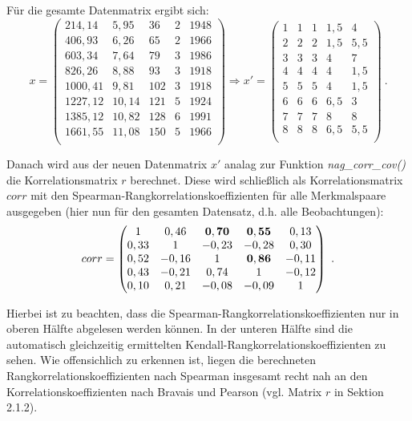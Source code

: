 \noindent Für die gesamte Datenmatrix ergibt sich:
\begin{equation*}
	x =
	\begin{pmatrix}
		214,14 & 5,95 & 36 & 2 & 1948\\
		406,93 & 6,26 & 65 & 2 & 1966\\
		603,34 & 7,64 & 79 & 3 & 1986\\
		826,26 & 8,88 & 93 & 3 & 1918\\
		1000,41 & 9,81 & 102 & 3 & 1918\\
		1227,12 & 10,14 & 121 & 5 & 1924\\
		1385,12 & 10,82 & 128 & 6 & 1991\\
		1661,55 & 11,08 & 150 & 5 & 1966\\
	\end{pmatrix}
	\Rightarrow
	x' =
	\begin{pmatrix}
		1 & 1 & 1 & 1,5 & 4\\
		2 & 2 & 2 & 1,5 & 5,5\\
		3 & 3 & 3 & 4 & 7\\
		4 & 4 & 4 & 4 & 1,5\\
		5 & 5 & 5 & 4 & 1,5\\
		6 & 6 & 6 & 6,5 & 3\\
		7 & 7 & 7 & 8 & 8\\
		8 & 8 & 8 & 6,5 & 5,5\\
	\end{pmatrix} ~.
\end{equation*}

\noindent Danach wird aus der neuen Datenmatrix $x'$ analag zur Funktion {\it nag\_corr\_cov()} die Korrelationsmatrix $r$ berechnet. Diese wird schließlich als Korrelationsmatrix $corr$ mit den Spearman-Rangkorrelationskoeffizienten für alle Merkmalspaare ausgegeben (hier nun für den gesamten Datensatz, d.h. alle Beobachtungen):
\begin{equation*}
	corr =
	\begin{pmatrix}
		1 & 0,46 & {\bf 0,70} & {\bf 0,55} & 0,13\\
		0,33 & 1 & -0,23 & -0,28 & 0,30\\
		0,52 & -0,16 & 1 & {\bf 0,86} & -0,11\\
		0,43 & -0,21 & 0,74 & 1 & -0,12\\
		0,10 & 0,21 & -0,08 & -0,09 & 1\\
	\end{pmatrix} ~.
\end{equation*}

\noindent Hierbei ist zu beachten, dass die Spearman-Rangkorrelationskoeffizienten nur in oberen Hälfte abgelesen werden können. In der unteren Hälfte sind die automatisch gleichzeitig ermittelten Kendall-Rangkorrelationskoeffizienten zu sehen. Wie offensichlich zu erkennen ist, liegen die berechneten Rangkorrelationskoeffizienten nach Spearman insgesamt recht nah an den Korrelationskoeffizienten nach Bravais und Pearson (vgl. Matrix $r$ in Sektion 2.1.2).

